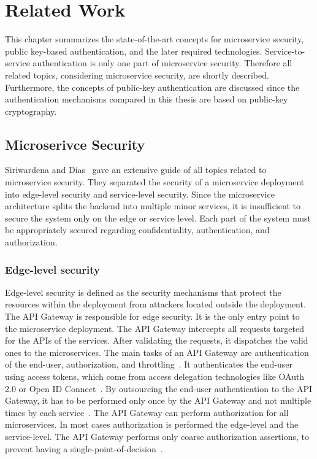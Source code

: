 \chapter{Related Work}
\label{cha:Related_Work}
This chapter summarizes the state-of-the-art concepts for microservice security, public key-based authentication, and the later required technologies.
Service-to-service authentication is only one part of microservice security.
Therefore all related topics, considering microservice security, are shortly described.
Furthermore, the concepts of public-key authentication are discussed since the authentication mechanisms compared in this thesis are based on public-key cryptography.

\section{Microserivce Security}
Siriwardena and Dias~\cite{dias2020microservices} gave an extensive guide of all topics related to microservice security. 
They separated the security of a microservice deployment into edge-level security and service-level security.
Since the microservice architecture splits the backend into multiple minor services, it is insufficient to secure the system only on the edge or service level.
Each part of the system must be appropriately secured regarding confidentiality, authentication, and authorization.

\subsection{Edge-level security}
Edge-level security is defined as the security mechanisms that protect the resources within the deployment from attackers located outside the deployment. 
The API Gateway is responsible for edge security.
It is the only entry point to the microservice deployment.
The API Gateway intercepts all requests targeted for the APIs of the services.
After validating the requests, it dispatches the valid ones to the microservices.
The main tasks of an API Gateway are authentication of the end-user, authorization, and throttling~\cite{dias2020microservices}.
It authenticates the end-user using access tokens, which come from access delegation technologies like OAuth 2.0 or Open ID Connect~\cite{siriwardena2014advanced}.
By outsourcing the end-user authentication to the API Gateway, it has to be performed only once by the API Gateway and not multiple times by each service~\cite{dias2020microservices}.
The API Gateway can perform authorization for all microservices. 
In most cases authorization is performed the edge-level and the service-level. 
The API Gateway performs only coarse authorization assertions, to prevent having a single-point-of-decision~\cite{barabanov2020authentication}.

